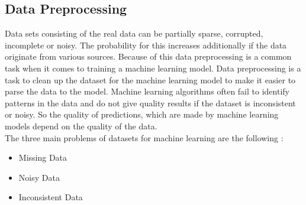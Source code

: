 \documentclass[../masterarbeit.tex]{subfiles}
\begin{document}
\subsection{Data Preprocessing}


Data sets consisting of the real data can be partially sparse, corrupted, incomplete or noisy. The probability for this increases additionally if the data originate from various sources. Because of this data preprocessing is a common task when it comes to training a machine learning model. Data preprocessing is a task to clean up the dataset for the machine learning model to make it easier to parse the data to the model. Machine learning algorithms often fail to identify patterns in the data  and do not give quality results if the dataset is inconsistent or noisy. So the quality of predictions, which are made by machine learning models depend on the quality of the data. \autocite[]{Pragati_Preprocessing:2022} \autocite[]{kotsiantis2006data} \\
The three main problems of datasets for machine learning are the following \autocite[]{Pragati_Preprocessing:2022}:
\begin{itemize}
	\item Missing Data
	\item Noisy Data
	\item Inconsistent Data
\end{itemize}
\end{document}
